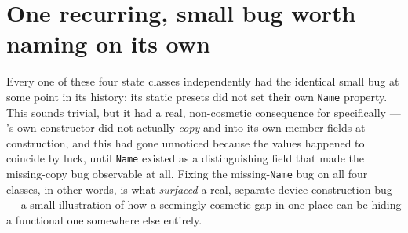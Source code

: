 \section{One recurring, small bug worth naming on its own}

Every one of these four state classes independently had the identical small bug at some
point in its history: its static presets did not set their own \texttt{Name} property. This
sounds trivial, but it had a real, non-cosmetic consequence for 
specifically --- 's own constructor did not actually \emph{copy}
 and 
into its own member fields at construction, and this had gone unnoticed because the values
happened to coincide by luck, until \texttt{Name} existed as a distinguishing field that
made the missing-copy bug observable at all. Fixing the missing-\texttt{Name} bug on all four
classes, in other words, is what \emph{surfaced} a real, separate device-construction bug ---
a small illustration of how a seemingly cosmetic gap in one place can be hiding a functional
one somewhere else entirely.
